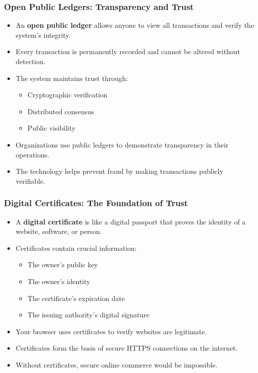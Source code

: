 \documentclass{beamer}
\begin{document}
\begin{frame}
    \frametitle{Open Public Ledgers: Transparency and Trust}
    
    \begin{itemize}
        \item An \textbf{open public ledger} allows anyone to view all transactions and verify the system's integrity.
        
        \item Every transaction is permanently recorded and cannot be altered without detection.
        
        \item The system maintains trust through:
            \begin{itemize}
                \item Cryptographic verification
                \item Distributed consensus
                \item Public visibility
            \end{itemize}
        
        \item Organizations use public ledgers to demonstrate transparency in their operations.
        
        \item The technology helps prevent fraud by making transactions publicly verifiable.
    \end{itemize}
\end{frame}

\begin{frame}
    \frametitle{Digital Certificates: The Foundation of Trust}
    
    \begin{itemize}
        \item A \textbf{digital certificate} is like a digital passport that proves the identity of a website, software, or person.
        
        \item Certificates contain crucial information:
            \begin{itemize}
                \item The owner's public key
                \item The owner's identity
                \item The certificate's expiration date
                \item The issuing authority's digital signature
            \end{itemize}
        
        \item Your browser uses certificates to verify websites are legitimate.
        
        \item Certificates form the basis of secure HTTPS connections on the internet.
        
        \item Without certificates, secure online commerce would be impossible.
    \end{itemize}
\end{frame}
\end{document}

